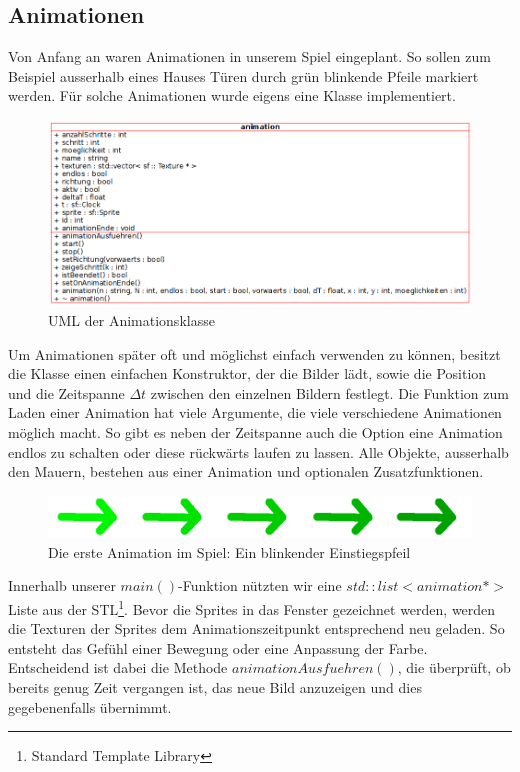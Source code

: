 \documentclass[11pt,a4paper]{scrbook}
\begin{document}
\subsection{Animationen}
Von Anfang an waren Animationen in unserem Spiel eingeplant. So sollen zum Beispiel ausserhalb eines Hauses
Türen durch grün blinkende Pfeile markiert werden. Für solche Animationen wurde eigens eine Klasse implementiert.
\begin{figure}[h]
    \centering
    \includegraphics[scale=0.6]{img/animation_uml.png}
    \caption{UML der Animationsklasse}
\end{figure}
Um Animationen später oft und möglichst einfach verwenden zu können, besitzt die Klasse einen einfachen Konstruktor,
der die Bilder lädt, sowie die Position und die Zeitspanne $\Delta t$ zwischen den einzelnen Bildern festlegt.
Die Funktion zum Laden einer Animation hat viele Argumente, die viele verschiedene Animationen möglich macht. So gibt es neben der Zeitspanne auch die Option eine Animation endlos zu schalten oder diese rückwärts laufen zu lassen. Alle Objekte, ausserhalb den Mauern, bestehen aus einer Animation und optionalen Zusatzfunktionen.
\begin{figure}[h]
    \centering
    \includegraphics[scale=0.3]{img/animation_pfeil.png}
    \caption{Die erste Animation im Spiel: Ein blinkender Einstiegspfeil}
\end{figure}
Innerhalb unserer $main()$-Funktion nützten wir eine $std::list<animation *>$ Liste aus der STL\footnote{Standard Template Library}.
Bevor die Sprites in das Fenster gezeichnet werden, werden die Texturen der Sprites dem Animationszeitpunkt entsprechend
neu geladen. So entsteht das Gefühl einer Bewegung oder eine Anpassung der Farbe. Entscheidend ist dabei die Methode
$animationAusfuehren()$, die überprüft, ob bereits genug Zeit vergangen ist, das neue Bild anzuzeigen und dies gegebenenfalls
übernimmt.
\end{document}
